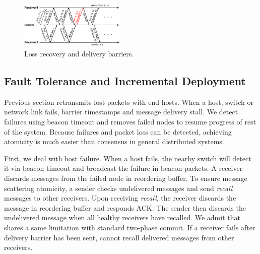 

\begin{figure}[t]
\centering
\includegraphics[width=0.45\textwidth]{images/loss_detection.pdf}
\caption{Loss recovery and delivery barriers.}
\label{fig:ack-barrier}
\vspace{-0.4em}
\end{figure}




\subsection{Fault Tolerance and Incremental Deployment}
\label{sec:failure}

Previous section retransmits lost packets with end hosts.
When a host, switch or network link fails, barrier timestamps and message delivery stall.
We detect failures using beacon timeout and removes failed nodes to resume progress of rest of the system.
Because failures and packet loss can be detected, achieving atomicity is much easier than consensus in general distributed systems.

First, we deal with host failure.
When a host fails, the nearby switch will detect it via beacon timeout and broadcast the failure in beacon packets.
A receiver discards messages from the failed node in reordering buffer.
To ensure message scattering atomicity, a sender checks undelivered messages and send \textit{recall} messages to other receivers.
Upon receiving \textit{recall}, the receiver discards the message in reordering buffer and responds ACK.
The sender then discards the undelivered message when all healthy receivers have recalled.
We admit that \sys shares a same limitation with standard two-phase commit.
If a receiver fails after delivery barrier has been sent, \sys cannot recall delivered messages from other receivers.

